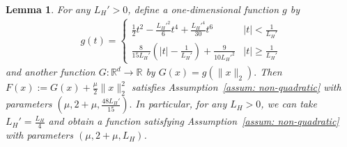 \documentclass[10pt,a4paper]{amsart}
\newtheorem{lemma}{Lemma}
\newcommand{\RR}{\mathbb{R}}
\newcommand{\liph}{L_H}
\begin{document}
\begin{lemma}\label{lem:function_justify_liph}
	For any $\liph' >0$, define a one-dimensional function $g$ by
	\begin{align*}
		g(t) = \begin{cases}
			\frac{1}{2} t^2 - \frac{\liph'^2}{6} t^4  + \frac{\liph'^4}{30} t^6 & |t| < \frac{1}{\liph'}\\
			\frac{8}{15\liph'}\left(|t| - \frac{1}{\liph'} \right) + \frac{9}{10\liph'^2} & |t| \ge \frac{1}{\liph'}
		\end{cases}
	\end{align*}
	and another function $G \colon \RR^d \rightarrow \RR$ by $G(x) = g(\|x\|_2).$  Then $ F(x) := G(x) + \frac{\mu}{2}\|x\|_2^2$ satisfies Assumption~\ref{assum: non-quadratic} with parameters $(\mu, 2+\mu, \frac{48\liph'}{15}).$ In particular, for any $\liph >0$, we can take $\liph' = \frac{ \liph}{4}$ and obtain a function satisfying Assumption~\ref{assum: non-quadratic} with parameters $(\mu, 2+\mu, \liph)$.
\end{lemma}
\end{document}
